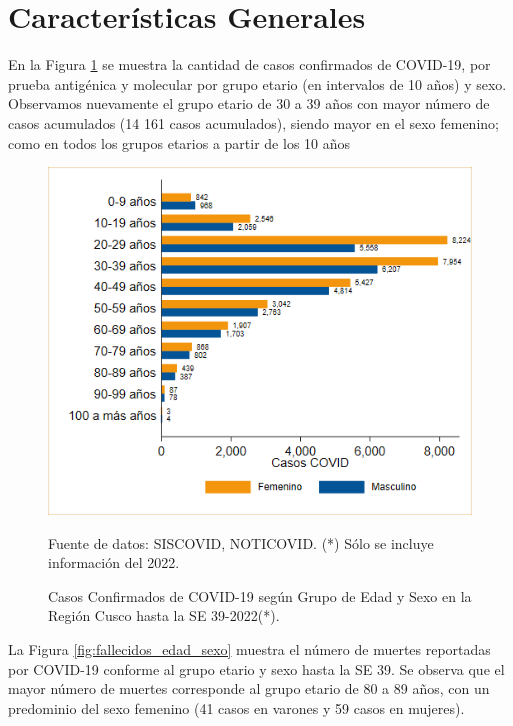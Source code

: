 \documentclass[12pt,a4paper,openany]{book}
\begin{document}
	
	\clearpage	
	\section*{Características Generales}
	
	
	
	\noindent En la Figura \ref{fig:casos_edad_sexo} se muestra la cantidad de casos confirmados de COVID-19, por prueba antigénica y molecular por grupo etario (en intervalos de 10 años) y sexo. Observamos nuevamente el grupo
	etario de 30 a 39 años con mayor número de casos acumulados (14 161 casos acumulados), siendo
	mayor en el sexo femenino; como en todos los grupos etarios a partir de los 10 años 
	
	
	\begin{figure}[h]
		\caption{Casos Confirmados de COVID-19 según Grupo de Edad y Sexo en la Región Cusco hasta la SE 39-2022(*).}\label{fig:casos_edad_sexo}
		\begin{center}
			\includegraphics[width=0.75\linewidth]{../figuras/casos_etapavida_2022}
		\end{center}
		{\footnotesize {Fuente de datos: SISCOVID, NOTICOVID. (*) Sólo se incluye información del 2022.}}
	\end{figure}
	\pagebreak
	
	
	La Figura \ref{fig:fallecidos_edad_sexo}  muestra el número de muertes reportadas por COVID-19 conforme al grupo etario y sexo hasta la SE 39.  Se observa que el mayor número de muertes corresponde al grupo etario de 80
	a 89 años, con un predominio del sexo femenino (41 casos en varones y 59 casos en mujeres).
	
\end{document}
